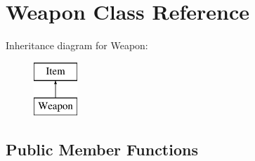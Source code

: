 \hypertarget{class_weapon}{}\section{Weapon Class Reference}
\label{class_weapon}
Inheritance diagram for Weapon\+:\begin{figure}[H]
\begin{center}
\leavevmode
\includegraphics[height=2.000000cm]{class_weapon}
\end{center}
\end{figure}
\subsection*{Public Member Functions}
